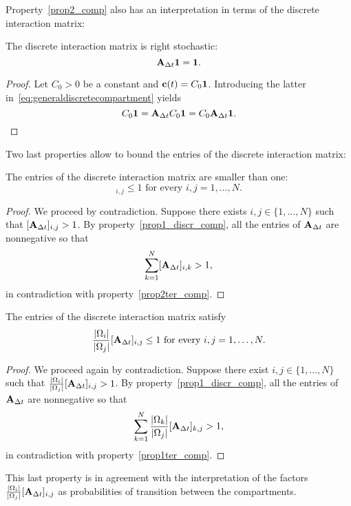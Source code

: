 Property~\ref{prop2_comp} also has an interpretation in terms of the discrete interaction matrix:
\begin{property} \label{prop2ter_comp} \label{prop3_discr_comp}
	The discrete interaction matrix is right stochastic:
	\begin{equation}
		\mathbf A_{\Delta t} \mathbf 1 = \mathbf 1.
	\end{equation}
\end{property}
\begin{proof}
	Let $C_0 > 0$ be a constant and $\mathbf c(t) = C_0 \mathbf 1$. Introducing the latter in~\eqref{eq:generaldiscretecompartment} yields
	\begin{equation}
		C_0 \mathbf 1 = \mathbf A_{\Delta t} C_0 \mathbf 1 = C_0 \mathbf A_{\Delta t} \mathbf 1.
	\end{equation}
\end{proof}
Two last properties allow to bound the entries of the discrete interaction matrix:
\begin{property} \label{prop4_discr_comp}
	The entries of the discrete interaction matrix are smaller than one:
	\begin{equation}
	 		[\b A_{\Delta t}]_{i,j} \le 1 \mbox{ for every } i,j = 1,\dots,N.
	\end{equation}
\end{property}
\begin{proof}
	We proceed by contradiction. Suppose there exists $i,j \in \{1,\dots,N\}$ such that $[\mathbf A_{\Delta t}]_{i,j} > 1$. By property~\ref{prop1_discr_comp}, all the entries of $\mathbf A_{\Delta t}$ are nonnegative so that
	\begin{equation}
		\sum_{k = 1}^N [\mathbf A_{\Delta t}]_{i,k} > 1,
	\end{equation}
	in contradiction with property~\ref{prop2ter_comp}.
\end{proof}
\begin{property} \label{prop5_discr_comp}
	The entries of the discrete interaction matrix satisfy
	\begin{equation}
		\frac{|\Omega_i|}{|\Omega_j|} [\mathbf A_{\Delta t}]_{i,j} \le 1 \mbox{ for every } i,j = 1,\dots,N.
	\end{equation}
\end{property}
\begin{proof}
	We proceed again by contradiction. Suppose there exist $i,j \in \{1,\dots,N\}$ such that $\frac{|\Omega_i|}{|\Omega_j|} [\mathbf A_{\Delta t}]_{i,j} > 1$. By property~\ref{prop1_discr_comp}, all the entries of $\mathbf A_{\Delta t}$ are nonnegative so that
	\begin{equation}
		\sum_{k = 1}^N \frac{|\Omega_k|}{|\Omega_j|}[\mathbf A_{\Delta t}]_{k,j} > 1,
	\end{equation}
	in contradiction with property~\ref{prop1ter_comp}.
\end{proof}
This last property is in agreement with the interpretation of the factors $\frac{|\Omega_i|}{|\Omega_j|} [\mathbf A_{\Delta t}]_{i,j}$ as probabilities of transition between the compartments.